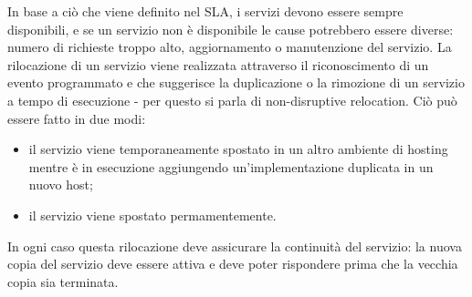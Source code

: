 In base a ciò che viene definito nel SLA, i servizi devono essere sempre disponibili, e se un servizio non è disponibile le cause potrebbero essere diverse: numero di richieste troppo alto, aggiornamento o manutenzione del servizio. La rilocazione di un servizio viene realizzata attraverso il riconoscimento di un evento programmato e che suggerisce la duplicazione o la rimozione di un servizio a tempo di esecuzione - per questo si parla di non-disruptive relocation. Ciò può essere fatto in due modi:
\begin{itemize}
    \item il servizio viene temporaneamente spostato in un altro ambiente di hosting mentre è in esecuzione aggiungendo un'implementazione duplicata in un nuovo host;
    \item il servizio viene spostato permamentemente.
\end{itemize}
In ogni caso questa rilocazione deve assicurare la continuità del servizio: la nuova copia del servizio deve essere attiva e deve poter rispondere prima che la vecchia copia sia terminata.

